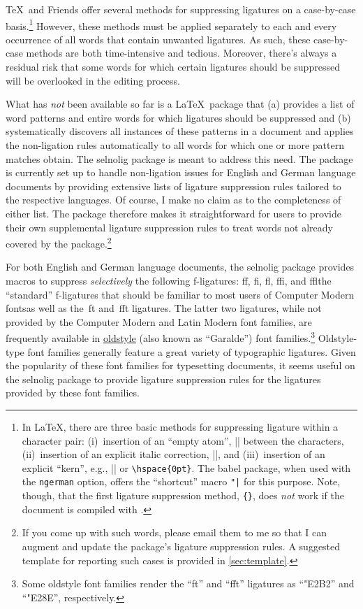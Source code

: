 \documentclass[11pt]{article}
\newcommand{\pkg}[1]{\textsf{#1}}
\newcommand{\opt}[1]{\texttt{#1}}
\begin{document}
\TeX\ and Friends offer several methods for suppressing ligatures on a case-by-case basis.\footnote{In \LaTeX, there are three basic methods for suppressing ligature within a character pair: (i)~insertion of an \enquote{empty atom}, |{}| between the characters, (ii)~insertion of an explicit italic correction, |\/|, and (iii)~insertion of an explicit \enquote{kern}, e.g., |\kern0pt| or \Verb/\hspace{0pt}/. The \pkg{babel} package, when used with the \opt{ngerman} option, offers the \enquote{shortcut} macro \Verb/"|/ for this purpose. Note, though, that the first ligature suppression method, \Verb/{}/, does \emph{not} work if the document is compiled with \LuaLaTeX.} However, these methods must be applied separately to each and every occurrence of all words that contain unwanted ligatures. As such, these case-by-case methods are both time-intensive and tedious. Moreover, there's always a residual risk that some words for which certain ligatures should be suppressed will be overlooked in the editing process. 

What has \emph{not} been available so far is a \LaTeX\ package that (a) provides a list of word patterns and entire words for which ligatures should be suppressed and (b) systematically discovers all instances of these patterns in a document and applies the non-ligation rules automatically to all words for which one or more pattern matches obtain. The \pkg{selnolig} package is meant to address this need. The package is currently set up to handle non-ligation issues for English and German language documents by providing extensive lists of ligature suppression rules tailored to the respective languages. Of course, I make no claim as to the completeness of either list. The package therefore makes it straightforward for users to provide their own supplemental ligature suppression rules to treat words not already covered by the package.\footnote{If you come up with such words, please email them to me so that I can augment and update the package's ligature suppression rules. A suggested template for reporting such cases is provided in \cref{sec:template}.} 

For both English and German language documents, the \pkg{selnolig} package provides macros to suppress \emph{selectively} the following f-ligatures: ff, fi, fl, ffi, and ffl\textemdash the \enquote{standard} f-ligatures that should be familiar to most users of Computer Modern fonts\textemdash as well as the~ft and~fft ligatures. The latter two ligatures, while not provided by the Computer Modern and Latin Modern font families, are frequently available in \href{http://en.wikipedia.org/wiki/Serif#Old_Style}{oldstyle} (also known as \enquote{Garalde}) font families.\footnote{Some oldstyle font families render the \enquote{ft} and \enquote{fft} ligatures as \enquote{\char"E2B2} and \enquote{\char"E28E}, respectively.} Oldstyle-type font families generally feature a great variety of typographic ligatures. Given the popularity of these font families for typesetting documents, it seems useful on the \pkg{selnolig} package to provide ligature suppression rules for the ligatures provided by these font families.
\end{document}

